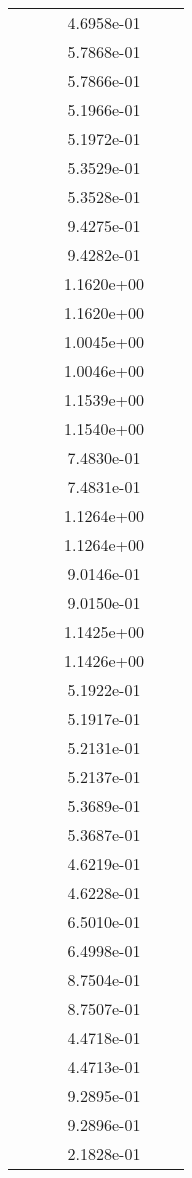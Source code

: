 \begin{xltabular}{\textwidth}{r|rS[table-format=1.3e+2]S[table-format=1.4e+2]S[table-format=1.4e+2]S[table-format=-1.5]}
&  &  & 4.6958e-01 & & \\
&  &  & 5.7868e-01 & & \\
&  &  & 5.7866e-01 & & \\
&  &  & 5.1966e-01 & & \\
&  &  & 5.1972e-01 & & \\
&  &  & 5.3529e-01 & & \\
&  &  & 5.3528e-01 & & \\
&  &  & 9.4275e-01 & & \\
&  &  & 9.4282e-01 & & \\
&  &  & 1.1620e+00 & & \\
&  &  & 1.1620e+00 & & \\
&  &  & 1.0045e+00 & & \\
&  &  & 1.0046e+00 & & \\
&  &  & 1.1539e+00 & & \\
&  &  & 1.1540e+00 & & \\
&  &  & 7.4830e-01 & & \\
&  &  & 7.4831e-01 & & \\
&  &  & 1.1264e+00 & & \\
&  &  & 1.1264e+00 & & \\
&  &  & 9.0146e-01 & & \\
&  &  & 9.0150e-01 & & \\
&  &  & 1.1425e+00 & & \\
&  &  & 1.1426e+00 & & \\
&  &  & 5.1922e-01 & & \\
&  &  & 5.1917e-01 & & \\
&  &  & 5.2131e-01 & & \\
&  &  & 5.2137e-01 & & \\
&  &  & 5.3689e-01 & & \\
&  &  & 5.3687e-01 & & \\
&  &  & 4.6219e-01 & & \\
&  &  & 4.6228e-01 & & \\
&  &  & 6.5010e-01 & & \\
&  &  & 6.4998e-01 & & \\
&  &  & 8.7504e-01 & & \\
&  &  & 8.7507e-01 & & \\
&  &  & 4.4718e-01 & & \\
&  &  & 4.4713e-01 & & \\
&  &  & 9.2895e-01 & & \\
&  &  & 9.2896e-01 & & \\
&  &  & 2.1828e-01 & & \\

\end{xltabular}
